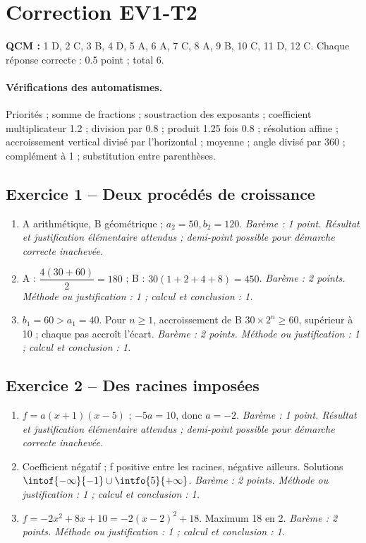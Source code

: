 \mxnewpage\section*{Correction EV1-T2}\label{EV1-T2-CORR}
\textbf{QCM :} 1 D, 2 C, 3 B, 4 D, 5 A, 6 A, 7 C, 8 A, 9 B, 10 C, 11 D, 12 C. Chaque réponse correcte : \num{0,5} point ; total 6.
\paragraph{Vérifications des automatismes.} Priorités ; somme de fractions ; soustraction des exposants ; coefficient multiplicateur \num{1,2} ; division par \num{0,8} ; produit \num{1,25} fois \num{0,8} ; résolution affine ; accroissement vertical divisé par l’horizontal ; moyenne ; angle divisé par 360 ; complément à 1 ; substitution entre parenthèses.
\subsection*{Exercice 1 -- Deux procédés de croissance}
\begin{enumerate}
\item A arithmétique, B géométrique ; $a_2=50,b_2=120$. \textit{Barème : 1 point. Résultat et justification élémentaire attendus ; demi-point possible pour démarche correcte inachevée.}
\item A : $\dfrac{4(30+60)}{2}=180$ ; B : $30(1+2+4+8)=450$. \textit{Barème : 2 points. Méthode ou justification : 1 ; calcul et conclusion : 1.}
\item $b_1=60>a_1=40$. Pour $n\geq1$, accroissement de B $30\times2^n\geq60$, supérieur à 10 ; chaque pas accroît l’écart. \textit{Barème : 2 points. Méthode ou justification : 1 ; calcul et conclusion : 1.}
\end{enumerate}
\subsection*{Exercice 2 -- Des racines imposées}
\begin{enumerate}
\item $f=a(x+1)(x-5)$ ; $-5a=10$, donc $a=-2$. \textit{Barème : 1 point. Résultat et justification élémentaire attendus ; demi-point possible pour démarche correcte inachevée.}
\item Coefficient négatif ; f positive entre les racines, négative ailleurs. Solutions $\intof{-\infty}{-1}\cup\intfo{5}{+\infty}$. \textit{Barème : 2 points. Méthode ou justification : 1 ; calcul et conclusion : 1.}
\item $f=-2x^2+8x+10=-2(x-2)^2+18$. Maximum 18 en 2. \textit{Barème : 2 points. Méthode ou justification : 1 ; calcul et conclusion : 1.}
\end{enumerate}
